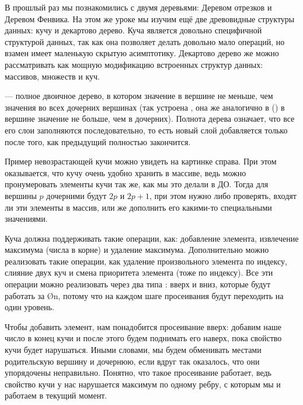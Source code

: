 В прошлый раз мы познакомились с двумя деревьями: Деревом отрезков и Деревом Фенвика. На этом же уроке мы изучим ещё две древовидные структуры данных: кучу и декартово дерево. Куча является довольно специфичной структурой данных, так как она позволяет делать довольно мало операций, но взамен имеет маленькую скрытую асимптотику. Декартово дерево же можно рассматривать как мощную модификацию встроенных структур данных: массивов, множеств и куч.


 — полное двоичное дерево, в котором значение в вершине не меньше, чем значения во всех дочерних вершинах (так устроена , она же  аналогично в  () в вершине значение не больше, чем в дочерних). Полнота дерева означает, что все его слои заполняются последовательно, то есть новый слой добавляется только после того, как предыдущий полностью закончится.

\begin{wrapping}{0.34}
    Пример невозрастающей кучи можно увидеть на картинке справа. При этом оказывается, что кучу очень удобно хранить в массиве, ведь можно пронумеровать элементы кучи так же, как мы это делали в ДО. Тогда для вершины $p$ дочерними будут $2p$ и $2p + 1$, при этом нужно либо проверять, входят ли эти элементы в массив, или же дополнить его какими-то специальными значениями.
\end{wrapping}

Куча должна поддерживать такие операции, как: добавление элемента, извлечение максимума (числа в корне) и удаление максимума. Дополнительно можно реализовать такие операции, как удаление произвольного элемента по индексу, слияние двух куч и смена приоритета элемента (тоже по индексу). Все эти операции можно реализовать через два типа : вверх и вниз, которые будут работать за \O{\log n}, потому что на каждом шаге просеивания будут переходить на один уровень.

Чтобы добавить элемент, нам понадобится просеивание вверх: добавим наше число в конец кучи и после этого будем поднимать его наверх, пока свойство кучи будет нарушаться. Иными словами, мы будем обменивать местами родительскую вершину и дочернюю, если вдруг так оказалось, что они упорядочены неправильно. Понятно, что такое просеивание работает, ведь свойство кучи у нас нарушается максимум по одному ребру, с которым мы и работаем в текущий момент.

